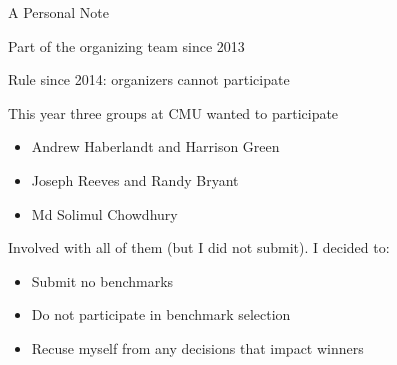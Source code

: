 \documentclass{beamer}
\begin{document}
\begin{frame}{A Personal Note}

Part of the organizing team since 2013

\bigskip

Rule since 2014: organizers cannot participate

\bigskip

This year three groups at CMU wanted to participate
\begin{itemize}
\item Andrew Haberlandt and Harrison Green 
\item Joseph Reeves and Randy Bryant 
\item Md Solimul Chowdhury
\end{itemize}

\bigskip

Involved with all of them (but I did not submit). I decided to:
\begin{itemize}
\item Submit no benchmarks
\item Do not participate in benchmark selection 
\item Recuse myself from any decisions that impact winners
\end{itemize}

\end{frame}
\end{document}

